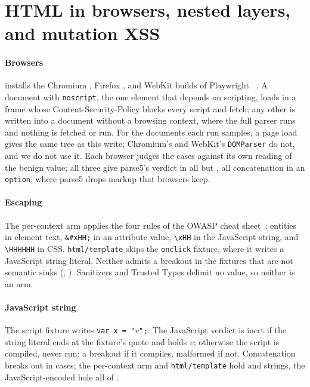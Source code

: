 \section{HTML in browsers, nested layers, and mutation XSS}
\label{sec:appendix:html}

\paragraph{Browsers}
 installs the Chromium \dataHtmlChromiumVersion, Firefox
\dataHtmlFirefoxVersion, and WebKit \dataHtmlWebkitVersion builds of Playwright
\dataPlaywrightVersion~\cite{playwright}.
A document with \texttt{noscript}, the one element that depends on scripting,
loads in a frame whose Content-Security-Policy blocks every script and fetch; any
other is written into a document without a browsing context, where the full
parser runs and nothing is fetched or run. For the \dataHtmlPageChecked documents each
run samples, a page load gives the same tree as this write; Chromium's and
WebKit's \texttt{DOMParser} do not, and we do not use it. Each browser judges the \dataHtmlBrowserCases cases
against its own reading of the benign value; all three give parse5's verdict in all
but \dataHtmlBrowserDiffers, all concatenation in an \texttt{option}, where
parse5 drops markup that browsers keep.

\paragraph{Escaping}
The per-context arm applies the four rules of the OWASP cheat
sheet~\cite{owasp_xss}: entities in element text, \verb|&#xHH;| in an attribute
value, \verb|\xHH| in the JavaScript string, and \verb|\HHHHHH| in CSS. \texttt{html/template} skips the
\texttt{onclick} fixture, where it writes a JavaScript string literal.
Neither admits a breakout in the fixtures that are not semantic sinks
(\dataHtmlEscapeContextBreakout, \dataHtmlAutoescapeBreakout). Sanitizers and
Trusted Types delimit no value, so neither is an arm.

\paragraph{JavaScript string}
The script fixture writes \verb|var x = "|$v$\verb|";|. The JavaScript verdict is
inert if the string literal ends at the fixture's quote and holds $v$; otherwise the
script is compiled, never run: a breakout if it compiles, malformed if not.
Concatenation breaks out in \dataHtmlJsConcatBreakout cases; the per-context arm
and \texttt{html/template} hold \dataHtmlJsEscapeContextInert and
\dataHtmlJsAutoescapeInert strings, the JavaScript-encoded hole all
\dataHtmlJsComposeInert of \dataHtmlJsComposeCases.

